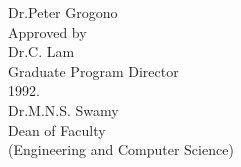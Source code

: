 {\begin{titlepage}
    \hspace*{77pt}Dr.\@ Peter Grogono\\[2.5ex]
    Approved by \hspace{9pt}\underline{\hspace{232pt}}\\
    \hspace*{79pt}Dr.\@ C. Lam\\
    \hspace*{79pt}Graduate Program Director\\[6ex]
    \underline{\hspace*{110pt}} 1992. \hspace{64pt} \underline{\hspace{219pt}}\\
    \hspace*{213pt}Dr.\@ M.N.S. Swamy\\
    \hspace*{213pt}Dean of Faculty\\    
    \hspace*{213pt}(Engineering and Computer Science)
  \end{titlepage}
}